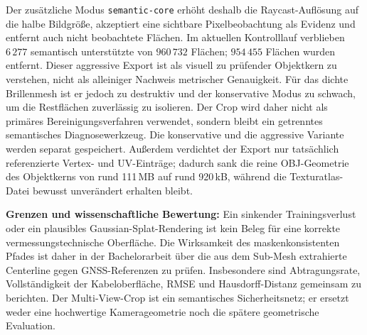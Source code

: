 \documentclass[12pt,a4paper]{article}
\begin{document}
Der zusätzliche Modus \texttt{semantic-core} erhöht deshalb die Raycast-Auflösung auf die halbe Bildgröße, akzeptiert eine sichtbare Pixelbeobachtung als Evidenz und entfernt auch nicht beobachtete Flächen. Im aktuellen Kontrolllauf verblieben $6\,277$ semantisch unterstützte von $960\,732$ Flächen; $954\,455$ Flächen wurden entfernt. Dieser aggressive Export ist als visuell zu prüfender Objektkern zu verstehen, nicht als alleiniger Nachweis metrischer Genauigkeit. Für das dichte Brillenmesh ist er jedoch zu destruktiv und der konservative Modus zu schwach, um die Restflächen zuverlässig zu isolieren. Der Crop wird daher nicht als primäres Bereinigungsverfahren verwendet, sondern bleibt ein getrenntes semantisches Diagnosewerkzeug. Die konservative und die aggressive Variante werden separat gespeichert. Außerdem verdichtet der Export nur tatsächlich referenzierte Vertex- und UV-Einträge; dadurch sank die reine OBJ-Geometrie des Objektkerns von rund 111\,MB auf rund 920\,kB, während die Texturatlas-Datei bewusst unverändert erhalten bleibt.

\textbf{Grenzen und wissenschaftliche Bewertung:} Ein sinkender Trainingsverlust oder ein plausibles Gaussian-Splat-Rendering ist kein Beleg für eine korrekte vermessungstechnische Oberfläche. Die Wirksamkeit des maskenkonsistenten Pfades ist daher in der Bachelorarbeit über die aus dem Sub-Mesh extrahierte Centerline gegen GNSS-Referenzen zu prüfen. Insbesondere sind Abtragungsrate, Vollständigkeit der Kabeloberfläche, RMSE und Hausdorff-Distanz gemeinsam zu berichten. Der Multi-View-Crop ist ein semantisches Sicherheitsnetz; er ersetzt weder eine hochwertige Kamerageometrie noch die spätere geometrische Evaluation.
\end{document}
